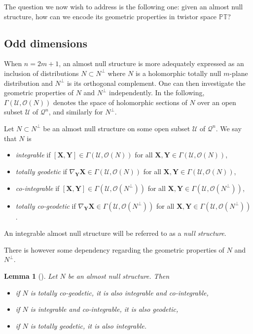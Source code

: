 \documentclass[10pt,a4paper]{amsart}
\numberwithin{equation}{section}
\newtheorem{Lemma}[Theorem]{Lemma}
\newcommand{\mc} [1]{\mathcal{#1}}
\newcommand{\PT} {\mathbb{PT}}
\begin{document}
The question we now wish to address is the following one: given an almost null structure, how can we encode its geometric properties in twistor space $\PT$?

\subsection{Odd dimensions}
When $n=2m+1$, an almost null structure is more adequately expressed as an inclusion of distributions $N \subset N^\perp$ where $N$ is a holomorphic totally null $m$-plane distribution and $N^\perp$ is its orthogonal complement. One can then investigate the geometric properties of $N$ and $N^\perp$ independently. In the following, $\Gamma (\mc{U}, \mc{O}(N))$ denotes the space of holomorphic sections of $N$ over an open subset $\mc{U}$ of $\mc{Q}^n$, and similarly for $N^\perp$.

\begin{Definition}\label{defn-int-co-geo}
Let $N \subset N^\perp$ be an almost null structure on some open subset $\mc{U}$ of $\mc{Q}^n$. We say that $N$ is
\begin{itemize}\itemsep=0pt
\item \emph{integrable} if $[\bm{X},\bm{Y}] \in \Gamma (\mc{U}, \mc{O}(N))$ for all $\bm{X}, \bm{Y} \in \Gamma (\mc{U}, \mc{O}(N))$,
\item \emph{totally geodetic} if $\nabla_{\bm{Y}} \bm{X} \in \Gamma (\mc{U}, \mc{O}(N))$ for all $\bm{X}, \bm{Y} \in \Gamma (\mc{U}, \mc{O}(N))$,
\item \emph{co-integrable} if $[\bm{X},\bm{Y}] \in \Gamma (\mc{U}, \mc{O}(N^\perp))$ for all $\bm{X}, \bm{Y} \in \Gamma (\mc{U}, \mc{O}(N^\perp))$,
\item \emph{totally co-geodetic} if $\nabla_{\bm{Y}} \bm{X} \in \Gamma (\mc{U}, \mc{O}(N^\perp))$ for all $\bm{X}, \bm{Y} \in \Gamma (\mc{U}, \mc{O}(N^\perp))$.
\end{itemize}
An integrable almost null structure will be referred to as a \emph{null structure}.
\end{Definition}

There is however some dependency regarding the geometric properties of $N$ and $N^\perp$.
\begin{Lemma}[\cite{Taghavi-Chabert2013}]\label{lem-co-geod-int-rel}
Let $N$ be an almost null structure. Then
\begin{itemize}\itemsep=0pt
\item if $N$ is totally co-geodetic, it is also integrable and co-integrable,
\item if $N$ is integrable and co-integrable, it is also geodetic,
\item if $N$ is totally geodetic, it is also integrable.
\end{itemize}
\end{Lemma}
\end{document}

